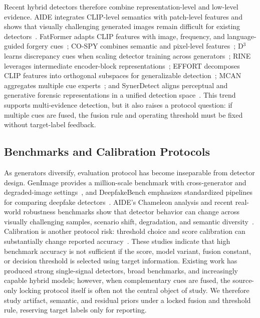 \documentclass[lettersize,journal]{IEEEtran}
\begin{document}
Recent hybrid detectors therefore combine representation-level and low-level evidence. AIDE integrates CLIP-level semantics with patch-level features and shows that visually challenging generated images remain difficult for existing detectors~\cite{yan2025aide}. FatFormer adapts CLIP features with image, frequency, and language-guided forgery cues~\cite{liu2024fatformer}; CO-SPY combines semantic and pixel-level features~\cite{cheng2025cospy}; D$^3$ learns discrepancy cues when scaling detector training across generators~\cite{yang2025d3}; RINE leverages intermediate encoder-block representations~\cite{koutlis2024rine}; EFFORT decomposes CLIP features into orthogonal subspaces for generalizable detection~\cite{yan2024effort}; MCAN aggregates multiple cue experts~\cite{tan2026mcan}; and SynerDetect aligns perceptual and generative forensic representations in a unified detection space~\cite{li2026synerdetect}. This trend supports multi-evidence detection, but it also raises a protocol question: if multiple cues are fused, the fusion rule and operating threshold must be fixed without target-label feedback.

\subsection{Benchmarks and Calibration Protocols}
As generators diversify, evaluation protocol has become inseparable from detector design. GenImage provides a million-scale benchmark with cross-generator and degraded-image settings~\cite{zhu2023genimage}, and DeepfakeBench emphasizes standardized pipelines for comparing deepfake detectors~\cite{yan2023deepfakebench}. AIDE's Chameleon analysis and recent real-world robustness benchmarks show that detector behavior can change across visually challenging samples, scenario shift, degradation, and semantic diversity~\cite{yan2025aide,li2025rrdataset}. Calibration is another protocol risk: threshold choice and score calibration can substantially change reported accuracy~\cite{yang2026calibrated}. These studies indicate that high benchmark accuracy is not sufficient if the score, model variant, fusion constant, or decision threshold is selected using target information. Existing work has produced strong single-signal detectors, broad benchmarks, and increasingly capable hybrid models; however, when complementary cues are fused, the source-only locking protocol itself is often not the central object of study. We therefore study artifact, semantic, and residual priors under a locked fusion and threshold rule, reserving target labels only for reporting.
\end{document}
